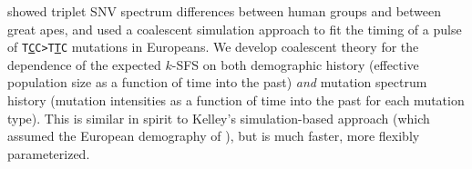 \documentclass[11pt]{article}
\begin{document}













\cite{Harris2017-fw} showed triplet SNV spectrum differences between human groups and between great apes, and used a coalescent simulation approach to fit the timing of a pulse of \texttt{T\underline{C}C>T\underline{T}C} mutations in Europeans.
We develop coalescent theory for the dependence of the expected $k$-SFS on both demographic history (effective population size as a function of time into the past) \emph{and} mutation spectrum history (mutation intensities as a function of time into the past for each mutation type).
This is similar in spirit to Kelley's simulation-based approach (which assumed the European demography of \cite{Tennessen2012-dq}), but is much faster, more flexibly parameterized.
\end{document}
